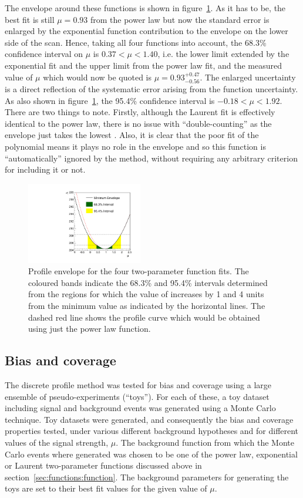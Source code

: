 The envelope around these functions is shown in
figure~\ref{fig:functions:envelope}.
As it has to be, the best fit is still $\mu=0.93$ from the power law
but now the standard error is enlarged by the exponential function
contribution to the
envelope on the lower side of the scan. Hence, taking all four functions into
account, the 68.3\% confidence interval on $\mu$ is
$0.37 < \mu < 1.40 $, i.e. the lower limit extended by 
the exponential fit and the upper limit from the power law fit,
and the measured value of $\mu$ which would now be quoted is 
$\mu = 0.93_{-0.56}^{+0.47}$.
The enlarged uncertainty is a direct reflection of the
systematic error arising from the function uncertainty.
As also shown in figure~\ref{fig:functions:envelope}, the 95.4\% confidence 
interval is $-0.18 < \mu < 1.92$.
There are two things to note. Firstly, although the Laurent fit
is effectively identical to the power law, there is no issue with 
``double-counting'' as the envelope just takes the lowest \nll.
Also, it is clear that the poor fit of the polynomial
means it plays no role in the envelope and so this function is 
``automatically'' ignored by the method,
without requiring any arbitrary criterion for
including it or not.
%
\begin{figure}[tbp]
\centering
\includegraphics[width=0.45\textwidth]{functions/Envelope.pdf}
\caption{Profile \nll envelope for the four two-parameter function fits.
The coloured bands indicate the 68.3\% and 95.4\% intervals determined from the regions 
for which the value of \nll increases by 1 and 4 units from the minimum value as indicated by the horizontal lines. The dashed red line shows the profile \nll
curve which would be obtained using just the power law function.}
\label{fig:functions:envelope}
\end{figure}


\subsection{Bias and coverage}
\label{sec:functions:coverage}

The discrete profile method was tested for bias and coverage 
using a large ensemble of
pseudo-experiments (``toys''). For each of these, a toy
dataset including signal and background events was generated using a Monte Carlo technique. Toy datasets were generated, and consequently the bias and coverage properties tested, under various different background hypotheses and for different values of the signal strength, $\mu$. The background function from which the Monte Carlo events where generated was chosen to be one of the power law,
exponential or Laurent two-parameter functions discussed above in 
section~\ref{sec:functions:function}. The background parameters for generating the toys are set to their best fit values for the given value of $\mu$. 

